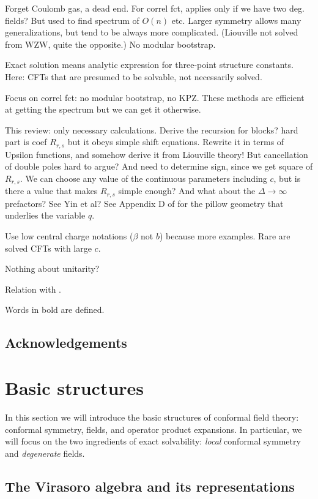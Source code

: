 \documentclass[12pt, a4paper]{article}
\theoremstyle{break}
\begin{document}
Forget Coulomb gas, a dead end. For correl fct, applies only if we have two deg. fields? But used to find spectrum of $O(n)$ etc. Larger symmetry allows many generalizations, but tend to be always more complicated. (Liouville not solved from WZW, quite the opposite.) No modular bootstrap. 

Exact solution means analytic expression for three-point structure constants. Here: CFTs that are presumed to be solvable, not necessarily solved. 

Focus on correl fct: no modular bootstrap, no KPZ. These methods are efficient at getting the spectrum but we can get it otherwise. 

This review: only necessary calculations. Derive the recursion for blocks? hard part is coef $R_{r,s}$ but it obeys simple shift equations. Rewrite it in terms of Upsilon functions, and somehow derive it from Liouville theory! But cancellation of double poles hard to argue? And need to determine sign, since we get square of $R_{r,s}$. We can choose any value of the continuous parameters including $c$, but is there a value that makes $R_{r,s}$ simple enough? And what about the $\Delta\to\infty$ prefactors? See Yin et al? See Appendix D of \cite{msz15} for the pillow geometry that underlies the variable $q$.

Use low central charge notations ($\beta$ not $b$) because more examples. Rare are solved CFTs with large $c$.

Nothing about unitarity?

Relation with \cite{rib16}.

Words in bold are defined.

\subsection*{Acknowledgements}



\section{Basic structures}

In this section we will introduce the basic structures of conformal field theory: conformal symmetry, fields, and operator product expansions. In particular, we will focus on the two ingredients of exact solvability: \textit{local} conformal symmetry and \textit{degenerate} fields. 

\subsection{The Virasoro algebra and its representations}
\end{document}
